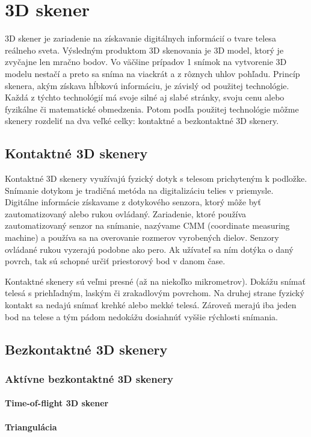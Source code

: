 \documentclass[thesismargins, thesislinespacing, twoside, upjsfrontpage]{rnthesis}
\begin{document}
\section{3D skener}
3D skener je zariadenie na získavanie digitálnych informácií o tvare telesa reálneho sveta. Výsledným produktom 3D skenovania je 3D model, ktorý je zvyčajne len mračno bodov. Vo väčšine prípadov 1 snímok na vytvorenie 3D modelu nestačí a preto sa sníma na viackrát a z rôznych uhlov pohľadu. Princíp skenera, akým získava hĺbkovú informáciu, je závislý od použitej technológie. Každá z týchto technológií má svoje silné aj slabé stránky, svoju cenu alebo fyzikálne či matematické obmedzenia. Potom podľa použitej technológie môžme skenery rozdeliť na dva veľké celky: kontaktné a bezkontaktné 3D skenery.
\subsection{Kontaktné 3D skenery}
Kontaktné 3D skenery využívajú fyzický dotyk s telesom prichyteným k podložke. Snímanie dotykom je tradičná metóda na digitalizáciu telies v priemysle. Digitálne informácie získavame z dotykového senzora, ktorý môže byť zautomatizovaný alebo rukou ovládaný. Zariadenie, ktoré používa zautomatizovaný senzor na snímanie, nazývame CMM (coordinate measuring machine) a používa sa na overovanie rozmerov vyrobených dielov. Senzory ovládané rukou vyzerajú podobne ako pero. Ak užívateľ sa ním dotýka o daný povrch, tak sú schopné určiť priestorový bod v danom čase.

Kontaktné skenery sú veľmi presné (až na niekoľko mikrometrov). Dokážu snímať telesá s priehľadným, laským či zrakadlovým povrchom. Na druhej strane fyzický kontakt sa nedajú snímať krehké alebo mekké telesá. Zároveň merajú iba jeden bod na telese a tým pádom nedokážu dosiahnúť vyššie rýchlosti snímania.
\subsection{Bezkontaktné 3D skenery}
\subsubsection{Aktívne bezkontaktné 3D skenery}
\paragraph{Time-of-flight 3D skener}
\paragraph{Triangulácia}
\end{document}
